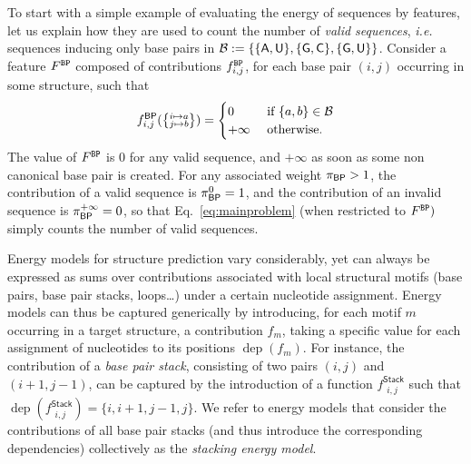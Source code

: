 \documentclass[]{bmcart}
\newcommand{\dep}{\operatorname{dep}}
\newcommand{\Def}[1]{\emph{#1}}
\newcommand{\Nuc}[1]{{\sf #1}}
\newcommand{\Ab}{\Nuc{A}}
\newcommand{\Cb}{\Nuc{C}}
\newcommand{\Gb}{\Nuc{G}}
\newcommand{\Ub}{\Nuc{U}}
\newcommand{\revised}[1]{{\color{red} #1}}
\begin{document}
\revised{
  To start with a simple example of evaluating the energy of sequences by features, let us explain how they are used to count the number of \Def{valid sequences}, \emph{i.e.} sequences inducing only base pairs in $\mathcal{B}:=\{\{\Ab,\Ub\}, \{\Gb,\Cb\}, \{\Gb,\Ub\}\}$. Consider a feature $F^{\tt BP}$ composed of  contributions $f^{\tt BP}_{i,j}$, for each base pair $(i,j)$ occurring in some structure, such that 
	$$f^{{\sf BP}}_{i,j}(\left\{\substack{i\mapsto a\\j\mapsto b}\right\})=\begin{cases}0&\text{ if }\{a,b\}\in\mathcal{B} \\+\infty&\text{ otherwise}.\end{cases}$$ 
        The value of $F^{\tt BP}$ is $0$ for any valid sequence, and $+\infty$ as soon as some non canonical base pair is created. For any associated weight $\pi_{{\sf BP}}>1$, the contribution of a valid sequence is $\pi_{{\sf BP}}^0 = 1$, and the contribution of an invalid sequence is $\pi_{{\sf BP}}^{+\infty} = 0$, so that Eq.~\ref{eq:mainproblem} (when restricted to $F^{\tt BP}) $simply counts the number of valid sequences.


        Energy models for structure prediction vary considerably, yet can always be expressed as sums over contributions associated with local structural motifs (base pairs, base pair stacks, loops\ldots) under a certain nucleotide assignment. Energy models can thus be captured generically by introducing, for each motif $m$ occurring in a target structure, a contribution $f_m$, taking a specific value for each assignment of nucleotides to its positions $\dep(f_m)$. For instance, the contribution of a \Def{base pair stack}, consisting of two pairs $(i,j)$ and $(i+1,j-1)$, can be captured by the introduction of a function $f^{\textsf{Stack}}_{\substack{i,j}}$ such that $\dep(f^{\textsf{Stack}}_{\substack{i,j}}) = \{i,i+1,j-1,j\}$.
        We refer to energy models that consider the contributions of all base pair stacks (and thus introduce the corresponding dependencies) collectively as the \Def{stacking energy model}.
}



\end{document}

